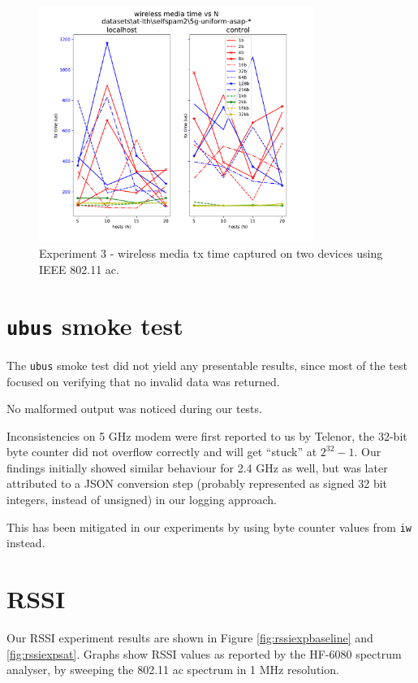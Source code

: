 \begin{figure}[tbp]
  \centering
  \includegraphics[width=0.8\textwidth]{images/exp4_wmt.pdf}
  \caption{Experiment 3 - wireless media tx time captured on two devices using IEEE 802.11 ac.}
  \label{fig:exp4mediatime}
\end{figure}

\section{\texttt{ubus} smoke test}

The \texttt{ubus} smoke test did not yield any presentable results, since most
of the test focused on verifying that no invalid data was returned.

No malformed output was noticed during our tests.

Inconsistencies on 5 GHz modem were first reported to us by Telenor, the 32-bit
byte counter did not overflow correctly and will get ``stuck'' at $2^{32} -
1$. Our findings initially showed similar behaviour for 2.4 GHz as well, but
was later attributed to a JSON conversion step (probably represented as signed
32 bit integers, instead of unsigned) in our logging approach.

This has been mitigated in our experiments by using byte counter values from
\texttt{iw} instead.

\section{RSSI}

Our RSSI experiment results are shown in Figure \ref{fig:rssiexpbaseline} and
\ref{fig:rssiexpsat}. Graphs show RSSI values as reported by the HF-6080
spectrum analyser, by sweeping the 802.11 ac spectrum in 1 MHz resolution.

